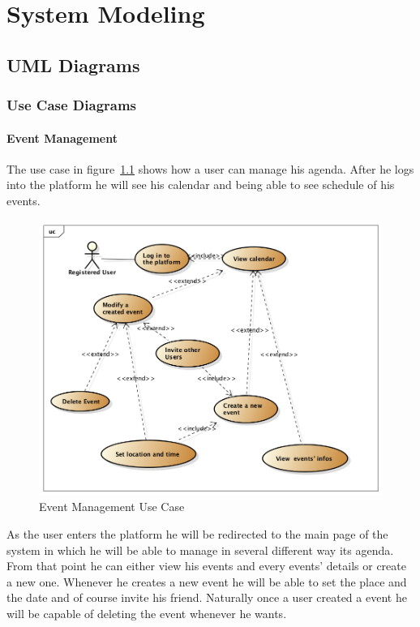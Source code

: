 \chapter{System Modeling} \label{cap:cap4}
\section{UML Diagrams}
\subsection{Use Case Diagrams}
\subsubsection{Event Management}
The use case in figure~\ref{fig:eventusecase} shows how a user can manage his agenda. After he logs into the platform he will see his calendar and being able to see schedule of his events. 
 \begin{center}
 \begin{figure}[H]
    \includegraphics[width=1\textwidth]{./UMLDiagram/use_case/EventManagmentUseCase/EventManagment.png}
    \caption{Event Management Use Case}
     \label{fig:eventusecase}
     \end{figure}
   \end{center}  
As the user enters the platform he will be redirected to the main page of the system in which he will be able to manage in several different way its agenda. From that point he can either view his events and every events' details or create a new one. Whenever he creates a new event he will be able to set the place and the date and of course invite his friend. Naturally once a user created a event he will be capable of deleting the event whenever he wants.
